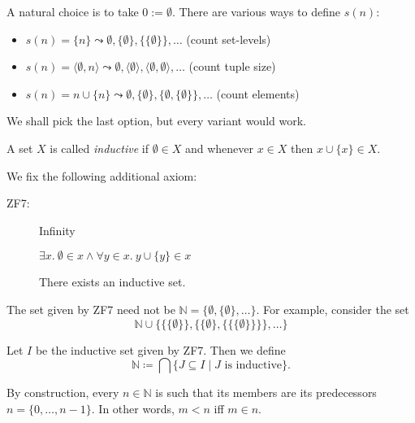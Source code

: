 \documentclass{whrartcl}
\newcommand{\NN}{\mathbb{N}}
\begin{document}
\begin{remark}[Constructing $\NN$]
  A natural choice is to take $0 := \emptyset$. There are various ways to define $s(n)$:
  \begin{itemize}
  \item $s(n) = \{n\} \leadsto \emptyset, \{\emptyset\}, \{\{\emptyset\}\},
    \ldots$ (count set-levels)
  \item $s(n) = \langle \emptyset, n \rangle \leadsto \emptyset, \langle
    \emptyset \rangle, \langle \emptyset, \emptyset \rangle, \ldots$ (count
    tuple size)
  \item $s(n) = n \cup \{n\} \leadsto \emptyset, \{\emptyset\}, \{\emptyset,
    \{\emptyset\}\}, \ldots$ (count elements)
  \end{itemize}
  We shall pick the last option, but every variant would work.
\end{remark}

\begin{definition}
  A set $X$ is called \emph{inductive} if $\emptyset \in X$ and whenever $x \in
  X$ then $x \cup \{x\} \in X$.

  We fix the following additional axiom:
  \begin{description}
  \item[ZF7:] Infinity

    $\exists x.~\emptyset \in x \wedge \forall y \in x.~y \cup \{y\} \in x$

    There exists an inductive set.
  \end{description}
\end{definition}

\begin{remark}
  The set given by ZF7 need not be $\NN = \{\emptyset, \{\emptyset\}, \ldots\}$.
  For example, consider the set
  \[
    \NN \cup \{\{\{\emptyset\}\}, \{\{\emptyset\}, \{\{\{\emptyset\}\}\}\}, \ldots\}
  \]
\end{remark}

\begin{definition}
  Let $I$ be the inductive set given by ZF7. Then we define
  \[\NN \coloneq \bigcap \{J \subseteq I \mid J \text{ is inductive}\}.\]
\end{definition}

\begin{observation}
  By construction, every $n \in \NN$ is such that its members are its
  predecessors $n = \{0, \ldots, n-1\}$. In other words, $m < n$ iff $m \in n$.
\end{observation}
\end{document}
